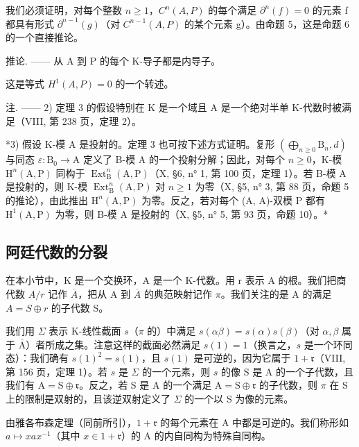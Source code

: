 我们必须证明，对每个整数 \(n \geqslant 1\)，\(C^{n}(A, P)\) 的每个满足 \(\partial^{n}(f) = 0\) 的元素 f 都具有形式 \(\partial^{n-1}(g)\)（对 \(C^{n-1}(A, P)\) 的某个元素 g）。由命题 5，这是命题 6 的一个直接推论。

推论. —— 从 A 到 P 的每个 K-导子都是内导子。

这是等式 \(H^{1}(A,P)=0\) 的一个转述。

注. —— 2) 定理 3 的假设特别在 K 是一个域且 A 是一个绝对半单 K-代数时被满足（VIII, 第 238 页，定理 2）。

*3) 假设 K-模 A 是投射的。定理 3 也可按下述方式证明。复形 \((\bigoplus_{n\geqslant 0}\mathrm{B}_n,d)\) 与同态 \(\varepsilon :\mathrm{B}_0\to \mathrm{A}\) 定义了 B-模 A 的一个投射分解；因此，对每个 \(n\geqslant 0\)，K-模 \(\mathrm{H}^n (\mathrm{A},\mathrm{P})\) 同构于 \(\operatorname {Ext}_{\mathrm{B}}^{n}(\mathrm{A},\mathrm{P})\)（X, §6, n° 1, 第 100 页，定理 1）。若 B-模 A 是投射的，则 K-模 \(\operatorname {Ext}_{\mathrm{B}}^{n}(\mathrm{A},\mathrm{P})\) 对 \(n\geqslant 1\) 为零（X, §5, n° 3, 第 88 页，命题 5 的推论），由此推出 \(\mathrm{H}^n (\mathrm{A},\mathrm{P})\) 为零。反之，若对每个 (A, A)-双模 P 都有 \(\mathrm{H}^1 (\mathrm{A},\mathrm{P})\) 为零，则 B-模 A 是投射的（X, §5, n° 5, 第 93 页，命题 10）。*

\subsection{阿廷代数的分裂}

在本小节中，K 是一个交换环，A 是一个 K-代数。用 r 表示 A 的根。我们把商代数 \(A/r\) 记作 \(\overline{A}\)，把从 A 到 \(\overline{A}\) 的典范映射记作 \(\pi\)。我们关注的是 A 的满足 \(A = S \oplus r\) 的子代数 S。

我们用 \(\Sigma\) 表示 K-线性截面 \(s\)（\(\pi\) 的）中满足 \(s(\alpha\beta) = s(\alpha)s(\beta)\)（对 \(\alpha, \beta\) 属于 \(\overline{\mathrm{A}}\)）者所成之集。注意这样的截面必然满足 \(s(1) = 1\)（换言之，\(s\) 是一个环同态）：我们确有 \(s(1)^2 = s(1)\)，且 \(s(1)\) 是可逆的，因为它属于 \(1 + \mathfrak{r}\)（VIII, 第 156 页，定理 1）。若 \(s\) 是 \(\Sigma\) 的一个元素，则 \(s\) 的像 S 是 A 的一个子代数，且我们有 \(\mathrm{A} = \mathrm{S} \oplus \mathfrak{r}\)。反之，若 S 是 A 的一个满足 \(\mathrm{A} = \mathrm{S} \oplus \mathfrak{r}\) 的子代数，则 \(\pi\) 在 S 上的限制是双射的，且该逆双射定义了 \(\Sigma\) 的一个以 S 为像的元素。

由雅各布森定理（同前所引），\(1 + \mathfrak{r}\) 的每个元素在 A 中都是可逆的。我们称形如 \(a \mapsto xax^{-1}\)（其中 \(x \in 1 + \mathfrak{r}\)）的 A 的内自同构为特殊自同构。

